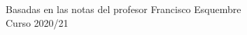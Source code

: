 \begin{titlepage}


{\large Basadas en las notas del profesor Francisco Esquembre}\\[2cm] %
{\large Curso 2020/21}\\[2cm] %

\end{titlepage}

